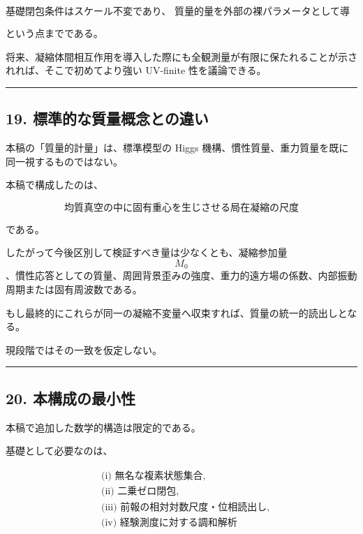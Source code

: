 \documentclass[
  a4paper,
]{ltjsarticle}
\begin{document}
\[
\boxed{
\text{基礎閉包条件はスケール不変であり、
質量的量を外部の裸パラメータとして導入しない}
}
\]

という点までである。

将来、凝縮体間相互作用を導入した際にも全観測量が有限に保たれることが示されれば、そこで初めてより強い
UV-finite 性を議論できる。

\begin{center}\rule{0.5\linewidth}{0.5pt}\end{center}

\subsection{19.
標準的な質量概念との違い}\label{ux6a19ux6e96ux7684ux306aux8ceaux91cfux6982ux5ff5ux3068ux306eux9055ux3044}

本稿の「質量的計量」は、標準模型の Higgs
機構、慣性質量、重力質量を既に同一視するものではない。

本稿で構成したのは、

\[
\boxed{
\text{均質真空の中に固有重心を生じさせる局在凝縮の尺度}
}
\]

である。

したがって今後区別して検証すべき量は少なくとも、凝縮参加量
\[M_0\]、慣性応答としての質量、周囲背景歪みの強度、重力的遠方場の係数、内部振動周期または固有周波数である。

もし最終的にこれらが同一の凝縮不変量へ収束すれば、質量の統一的読出しとなる。

現段階ではその一致を仮定しない。

\begin{center}\rule{0.5\linewidth}{0.5pt}\end{center}

\subsection{20.
本構成の最小性}\label{ux672cux69cbux6210ux306eux6700ux5c0fux6027}

本稿で追加した数学的構造は限定的である。

基礎として必要なのは、

\[
\boxed{
\begin{aligned}
&\text{(i) 無名な複素状態集合},\\
&\text{(ii) 二乗ゼロ閉包},\\
&\text{(iii) 前報の相対対数尺度・位相読出し},\\
&\text{(iv) 経験測度に対する調和解析}
\end{aligned}
}
\]
\end{document}
